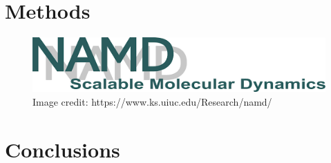 \graphicspath{{figures/4/}}

\section{Methods}

\begin{figure}[H]
\centering
	\includegraphics[width=\textwidth]{namd-logo.png}
    \caption[namd logo]{Image credit: https://www.ks.uiuc.edu/Research/namd/}
    \label{namd-logo}
\end{figure}

\section{Conclusions}
